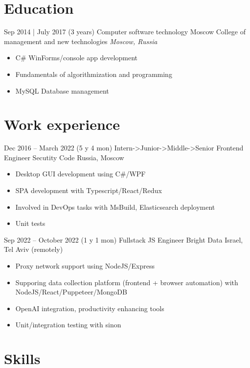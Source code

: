\documentclass[a4paper]{moderncv}        %
\begin{document}
\makecvtitle


\section{Education}
\cventry
{Sep 2014 | July 2017 (3 years)}
{Computer software technology}
{Moscow College of management and new technologies}
{}
{\textit{Moscow, Russia}}
{\begin{itemize}%
	 \item C\# WinForms/console app development
	 \item Fundamentals of algorithmization and programming
	 \item MySQL Database management
\end{itemize}}
\section{Work experience}
\cventry
{Dec 2016 -- March 2022 (5 y 4 mon)}
{Intern-\textgreater{}Junior-\textgreater{}Middle-\textgreater{}Senior Frontend Engineer}
{Secutity Code}
{Russia, Moscow}
{}
{\begin{itemize}%
	\item Desktop GUI development using C\#/WPF
	\item SPA development with Typescript/React/Redux
	\item Involved in DevOps tasks with MsBuild, Elasticsearch deployment
	\item Unit tests
	\end{itemize}}
\cventry
{Sep 2022 -- October 2022 (1 y 1 mon)}
{Fullstack JS Engineer}
{Bright Data}
{Israel, Tel Aviv (remotely)}
{}
{\begin{itemize}%
	\item Proxy network support using NodeJS/Express
	\item Supporing data collection platform (frontend + browser automation) with NodeJS/React/Puppeteer/MongoDB
	\item OpenAI integration, productivity enhancing tools
	\item Unit/integration testing with sinon
	\end{itemize}}
\section{Skills}
\end{document}
